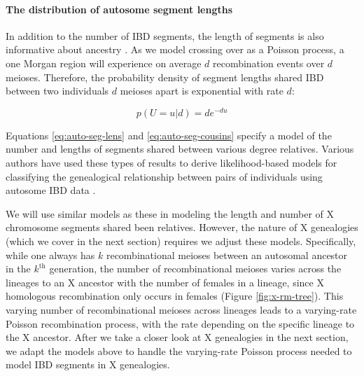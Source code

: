 \documentclass[11pt]{article}
\begin{document}
\paragraph{The distribution of autosome segment lengths}

In addition to the number of IBD segments, the length of segments is also
informative about ancestry \citep[e.g.][]{palamara2012length}. As we model
crossing over as a Poisson process, a one Morgan region will experience on
average $d$ recombination events over $d$ meioses. Therefore, the probability
density of segment lengths shared IBD between two individuals $d$ meioses apart
is exponential with rate $d$:

\begin{equation}
  \label{eq:auto-seg-lens}
  p(U=u | d) = d e^{-du}
\end{equation}

Equations \eqref{eq:auto-seg-lens} and \eqref{eq:auto-seg-cousins} specify a
model of the number and lengths of segments shared between various degree
relatives. Various authors have used these types of results to derive
likelihood-based models for classifying the genealogical relationship between
pairs of individuals using autosome IBD data
\citep{huff2011maximum,Henn:2012ij,Durand010512}. 

We will use similar models as these in modeling the length and number of X
chromosome segments shared been relatives. However, the nature of X genealogies
(which we cover in the next section) requires we adjust these models.
Specifically, while one always has $k$ recombinational meioses between an
autosomal ancestor in the $k^\text{th}$ generation, the number of
recombinational meioses varies across the lineages to an X ancestor with the
number of females in a lineage, since X homologous recombination only occurs in
females (Figure \ref{fig:x-rm-tree}). This varying number of recombinational
meioses across lineages leads to a varying-rate Poisson recombination process,
with the rate depending on the specific lineage to the X ancestor. After we
take a closer look at X genealogies in the next section, we adapt the models
above to handle the varying-rate Poisson process needed to model IBD segments
in X genealogies.
\end{document}
